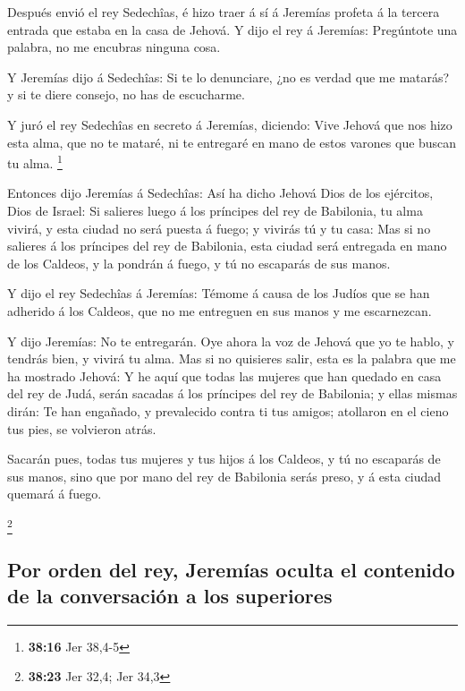  Después envió el rey Sedechîas, é hizo traer á sí á
Jeremías profeta á la tercera entrada que estaba en la casa de Jehová. Y
dijo el rey á Jeremías: Pregúntote una palabra, no me encubras ninguna
cosa.

 Y Jeremías dijo á Sedechîas: Si te lo denunciare, ¿no es
verdad que me matarás? y si te diere consejo, no has de escucharme.

 Y juró el rey Sedechîas en secreto á Jeremías, diciendo:
Vive Jehová que nos hizo esta alma, que no te mataré, ni te entregaré en
mano de estos varones que buscan tu alma. \footnote{\textbf{38:16} Jer
  38,4-5}

 Entonces dijo Jeremías á Sedechîas: Así ha dicho Jehová
Dios de los ejércitos, Dios de Israel: Si salieres luego á los príncipes
del rey de Babilonia, tu alma vivirá, y esta ciudad no será puesta á
fuego; y vivirás tú y tu casa:  Mas si no salieres á los
príncipes del rey de Babilonia, esta ciudad será entregada en mano de
los Caldeos, y la pondrán á fuego, y tú no escaparás de sus manos.

 Y dijo el rey Sedechîas á Jeremías: Témome á causa de
los Judíos que se han adherido á los Caldeos, que no me entreguen en sus
manos y me escarnezcan.

 Y dijo Jeremías: No te entregarán. Oye ahora la voz de
Jehová que yo te hablo, y tendrás bien, y vivirá tu alma.
 Mas si no quisieres salir, esta es la palabra que me ha
mostrado Jehová:  Y he aquí que todas las mujeres que han
quedado en casa del rey de Judá, serán sacadas á los príncipes del rey
de Babilonia; y ellas mismas dirán: Te han engañado, y prevalecido
contra ti tus amigos; atollaron en el cieno tus pies, se volvieron
atrás.

 Sacarán pues, todas tus mujeres y tus hijos á los
Caldeos, y tú no escaparás de sus manos, sino que por mano del rey de
Babilonia serás preso, y á esta ciudad quemará á fuego.

\footnote{\textbf{38:23} Jer 32,4; Jer 34,3}

\hypertarget{por-orden-del-rey-jeremuxedas-oculta-el-contenido-de-la-conversaciuxf3n-a-los-superiores}{%
\subsection{Por orden del rey, Jeremías oculta el contenido de la
conversación a los
superiores}\label{por-orden-del-rey-jeremuxedas-oculta-el-contenido-de-la-conversaciuxf3n-a-los-superiores}}

